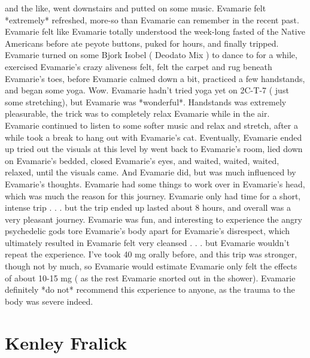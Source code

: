\documentclass[12pt]{book}
\begin{document}
and the like, went downstairs and putted on some music. Evamarie felt *extremely* refreshed, more-so than Evamarie can remember in the recent past. Evamarie felt like Evamarie totally understood the week-long fasted of the Native Americans before ate peyote buttons, puked for hours, and finally tripped. Evamarie turned on some Bjork Isobel ( Deodato Mix ) to dance to for a while, exercised Evamarie's crazy aliveness felt, felt the carpet and rug beneath Evamarie's toes, before Evamarie calmed down a bit, practiced a few handstands, and began some yoga. Wow. Evamarie hadn't tried yoga yet on 2C-T-7 ( just some stretching), but Evamarie was *wonderful*. Handstands was extremely pleasurable, the trick was to completely relax Evamarie while in the air. Evamarie continued to listen to some softer music and relax and stretch, after a while took a break to hang out with Evamarie's cat. Eventually, Evamarie ended up tried out the visuals at this level by went back to Evamarie's room, lied down on Evamarie's bedded, closed Evamarie's eyes, and waited, waited, waited, relaxed, until the visuals came. And Evamarie did, but was much influenced by Evamarie's thoughts. Evamarie had some things to work over in Evamarie's head, which was much the reason for this journey. Evamarie only had time for a short, intense trip . . .  but the trip ended up lasted about 8 hours, and overall was a very pleasant journey. Evamarie was fun, and interesting to experience the angry psychedelic gods tore Evamarie's body apart for Evamarie's disrespect, which ultimately resulted in Evamarie felt very cleansed . . .  but Evamarie wouldn't repeat the experience. I've took 40 mg orally before, and this trip was stronger, though not by much, so Evamarie would estimate Evamarie only felt the effects of about 10-15 mg ( as the rest Evamarie snorted out in the shower). Evamarie definitely *do not* recommend this experience to anyone, as the trauma to the body was severe indeed.



\chapter{Kenley Fralick}
\end{document}
